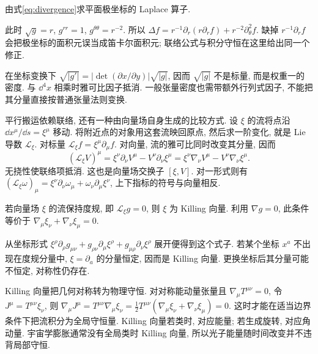 \begin{example}
由式\eqref{eq:divergence}求平面极坐标的 Laplace 算子.
\end{example}
\begin{solution}
此时 $\sqrt g=r$, $g^{rr}=1$, $g^{\theta\theta}=r^{-2}$. 所以 $\Delta f=r^{-1}\partial_r(r\partial_rf)+r^{-2}\partial_\theta^2 f$. 缺掉 $r^{-1}\partial_r f$ 会把极坐标的面积元误当成笛卡尔面积元; 联络公式与积分守恒在这里给出同一个修正.
\end{solution}

在坐标变换下 $\sqrt{|g'|}=|\det(\partial x/\partial y)|\sqrt{|g|}$, 因而 $\sqrt{|g|}$ 不是标量, 而是权重一的密度. 与 $\dd^4x$ 相乘时雅可比因子抵消. 一般张量密度也需带额外行列式因子, 不能把其分量直接按普通张量法则变换.

平行搬运依赖联络, 还有一种由向量场自身生成的比较方式. 设 $\xi$ 的流将点沿 $\dd x^\mu/\dd s=\xi^\mu$ 移动. 将附近点的对象用这套流映回原点, 然后求一阶变化, 就是 Lie 导数 $\mathcal L_\xi$. 对标量 $\mathcal L_\xi f=\xi^\mu\partial_\mu f$. 对向量, 流的雅可比同时改变其分量, 因而
\begin{equation}\label{eq:lie-vector}
(\mathcal L_\xi V)^\mu=\xi^\nu\partial_\nu V^\mu-V^\nu\partial_\nu\xi^\mu
=\xi^\nu\nabla_\nu V^\mu-V^\nu\nabla_\nu\xi^\mu.
\end{equation}
无挠性使联络项抵消. 这也是向量场交换子 $[\xi,V]$. 对一形式则有 $(\mathcal L_\xi\omega)_\mu=\xi^\nu\partial_\nu\omega_\mu+\omega_\nu\partial_\mu\xi^\nu$, 上下指标的符号与向量相反.

\begin{definition}
若向量场 $\xi$ 的流保持度规, 即 $\mathcal L_\xi g=0$, 则 $\xi$ 为 Killing 向量. 利用 $\nabla g=0$, 此条件等价于 $\nabla_\mu\xi_\nu+\nabla_\nu\xi_\mu=0$.
\end{definition}
从坐标形式 $\xi^\rho\partial_\rho g_{\mu\nu}+g_{\rho\nu}\partial_\mu\xi^\rho+g_{\mu\rho}\partial_\nu\xi^\rho$ 展开便得到这个式子. 若某个坐标 $x^a$ 不出现在度规分量中, $\xi=\partial_a$ 的分量恒定, 因而是 Killing 向量. 更换坐标后其分量可能不恒定, 对称性仍存在.

Killing 向量把几何对称转为物理守恒. 对对称能动量张量且 $\nabla_\mu T^{\mu\nu}=0$, 令 $J^\mu=T^{\mu\nu}\xi_\nu$, 则
$\nabla_\mu J^\mu=T^{\mu\nu}\nabla_\mu\xi_\nu=\frac12T^{\mu\nu}(\nabla_\mu\xi_\nu+\nabla_\nu\xi_\mu)=0$.
这时才能在适当边界条件下把流积分为全局守恒量. Killing 向量若类时, 对应能量; 若生成旋转, 对应角动量. 宇宙学膨胀通常没有全局类时 Killing 向量, 所以光子能量随时间改变并不违背局部守恒.
